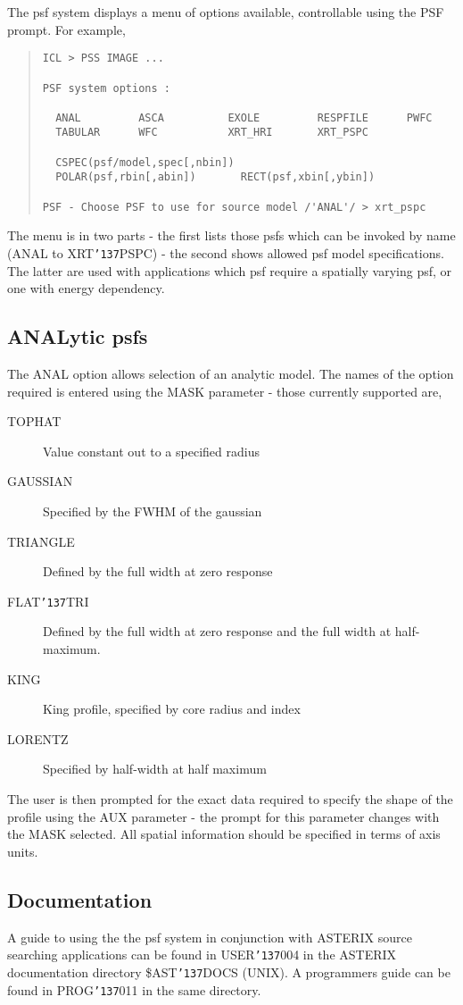 \documentclass{book}
\renewcommand{\_}{{\tt\char'137}}     %
\begin{document}
The psf system displays a menu of options available, controllable
using the PSF prompt. For example,
 
\begin{quote}\begin{verbatim}
ICL > PSS IMAGE ...
 
PSF system options :
 
  ANAL         ASCA          EXOLE         RESPFILE      PWFC
  TABULAR      WFC           XRT_HRI       XRT_PSPC
 
  CSPEC(psf/model,spec[,nbin])
  POLAR(psf,rbin[,abin])       RECT(psf,xbin[,ybin])
 
PSF - Choose PSF to use for source model /'ANAL'/ > xrt_pspc
\end{verbatim}\end{quote}
The menu is in two parts - the first lists those psfs which can
be invoked by name (ANAL to XRT\_PSPC) - the second shows allowed
psf model specifications. The latter are used with applications
which psf require a spatially varying psf, or one with energy
dependency.
 
\subsection{ANALytic psfs}
The ANAL option allows selection of an analytic model. The names of
the option required is entered using the MASK parameter - those
currently supported are,
 
 
\begin{description}
\item[TOPHAT]
Value constant out to a specified radius
\item[GAUSSIAN]
Specified by the FWHM of the gaussian
\item[TRIANGLE]
Defined by the full width at zero response
\item[FLAT\_TRI]
Defined by the full width at zero response and the
full width at half-maximum.
\item[KING]
King profile, specified by core radius and index
\item[LORENTZ]
Specified by half-width at half maximum
\end{description}
The user is then prompted for the exact data required to specify the
shape of the profile using the AUX parameter - the prompt for this
parameter changes with the MASK selected. All spatial information
should be specified in terms of axis units.
 
\subsection{Documentation}
A guide to using the the psf system in conjunction with ASTERIX
source searching applications can be found in USER\_004 in the
ASTERIX documentation directory \$AST\_DOCS (UNIX). A programmers
guide can be found in PROG\_011 in the same directory.
 
\end{document}
